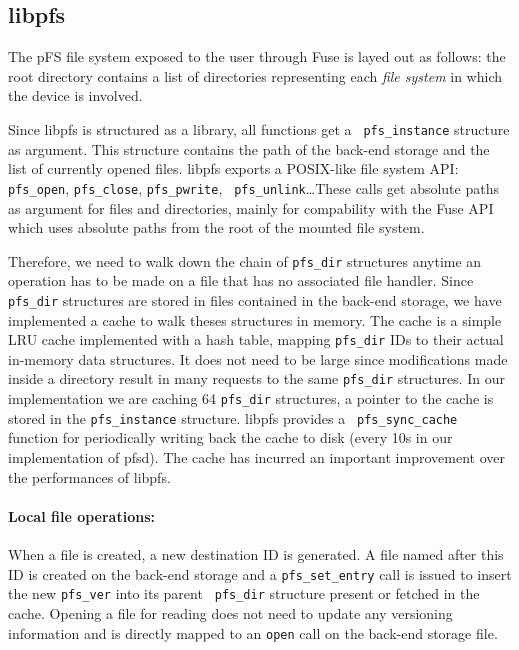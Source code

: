 \subsection {libpfs}

The pFS file system exposed to the user through Fuse is layed
out as follows: the root directory contains a list of directories
representing each \emph{file system} in which the device is
involved. 

Since libpfs is structured as a library, all functions get a {\tt
  pfs\_instance} structure as argument. This structure contains the
path of the back-end storage and the list of currently opened
files. libpfs exports a POSIX-like file system API: {\tt
  pfs\_open}, {\tt pfs\_close}, {\tt pfs\_pwrite}, {\tt
  pfs\_unlink}\ldots These calls get absolute paths as argument for
files and directories, mainly for compability with the Fuse API which
uses absolute paths from the root of the mounted file system.

Therefore, we need to walk down the chain of {\tt pfs\_dir} structures
anytime an operation has to be made on a file that has no associated
file handler. Since {\tt pfs\_dir} structures are stored in files
contained in the back-end storage, we have implemented a cache to walk
theses structures in memory.  The cache is a simple LRU cache
implemented with a hash table, mapping {\tt pfs\_dir} IDs to their
actual in-memory data structures. It does not need to be large since
modifications made inside a directory result in many requests to the
same {\tt pfs\_dir} structures. In our implementation we are caching
64 {\tt pfs\_dir} structures, a pointer to the cache is stored in the
{\tt pfs\_instance} structure. libpfs provides a {\tt
  pfs\_sync\_cache} function for periodically writing back the cache
to disk (every 10s in our implementation of pfsd). The cache has
incurred an important improvement over the performances of libpfs.

\paragraph{Local file operations:}
When a file is created, a new destination ID is generated. A file named
after this ID is created on the back-end storage and a {\tt pfs\_set\_entry}
call is issued to insert the new {\tt pfs\_ver} into its parent {\tt
  pfs\_dir} structure present or fetched in the cache.  Opening a file
for reading does not need to update any versioning information and is
directly mapped to an {\tt open} call on the back-end storage file.

